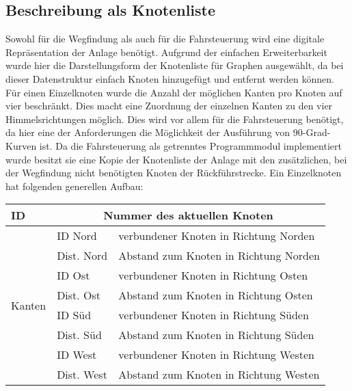 		\subsection{Beschreibung als Knotenliste}
			\label{Knotenliste}
			Sowohl für die Wegfindung als auch für die Fahrsteuerung wird eine digitale Repräsentation der Anlage benötigt. Aufgrund der einfachen Erweiterbarkeit wurde hier die Darstellungsform der Knotenliste für Graphen ausgewählt, da bei dieser Datenstruktur einfach Knoten hinzugefügt und entfernt werden können. Für einen Einzelknoten wurde die Anzahl der möglichen Kanten pro Knoten auf vier beschränkt. Dies macht eine Zuordnung der einzelnen Kanten zu den vier Himmelsrichtungen möglich. Dies wird vor allem für die Fahrsteuerung benötigt, da hier eine der Anforderungen die Möglichkeit der Ausführung von 90-Grad-Kurven ist. Da die Fahrsteuerung als getrenntes Programmmodul implementiert wurde besitzt sie eine Kopie der Knotenliste der Anlage mit den zusätzlichen, bei der Wegfindung nicht benötigten Knoten der Rückführstrecke.
			Ein Einzelknoten hat folgenden generellen Aufbau:\\
			
			\begin{tabular}{| l | l | l |}
				
				\hline
				\textbf{ID} &
				\multicolumn{2}{c|}{Nummer des aktuellen Knoten} \\
				\hline
				\multirow{8}{*}{Kanten}
					& ID Nord & verbundener Knoten in Richtung Norden \\ \cline{2-3}
					& Dist. Nord & Abstand zum Knoten in Richtung Norden\\ \cline{2-3}
					& ID Ost & verbundener Knoten in Richtung Osten \\ \cline{2-3}
					& Dist. Ost & Abstand zum Knoten in Richtung Osten\\ \cline{2-3}
					& ID Süd & verbundener Knoten in Richtung Süden\\ \cline{2-3}
					& Dist. Süd & Abstand zum Knoten in Richtung Süden\\ \cline{2-3}
					& ID West & verbundener Knoten in Richtung Westen\\ \cline{2-3}
					& Dist. West & Abstand zum Knoten in Richtung Westen\\ 
					\hline
	
			\end{tabular}\\
			
